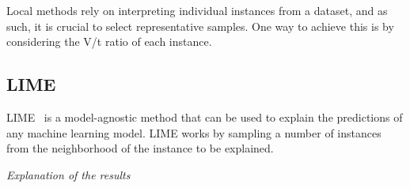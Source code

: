 Local methods rely on interpreting individual instances from a dataset, and as such, it is
crucial to select representative samples.
One way to achieve this is by considering the V/t ratio of each instance.

\subsection{LIME}\label{subsec:lime}
LIME~\cite{ribeiro2016model} is a model-agnostic method that can be used to explain the
predictions of any machine learning model.
LIME works by sampling a number of instances from the neighborhood of the instance to be
explained.

\textit{Explanation of the results}

